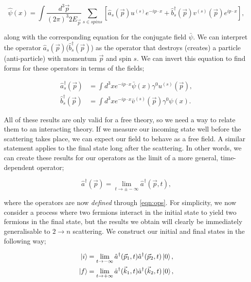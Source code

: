 \begin{equation}
\hat{\psi}(x) = \int \frac{d^3 \vec{p}}{(2 \pi)^3 2 E_{\vec{p}}} \sum_{s \in spins} \left[\hat{a}_s(\vec{p}) u^{(s)} e^{-ip\cdot x} + \hat{b}_s^\dagger(\vec{p}) v^{(s)}(\vec{p})e^{i p \cdot x} \right],
\end{equation}

along with the corresponding equation for the conjugate field $\bar{\psi}$. We can interpret the operator $\hat{a}_s(\vec{p})$($\hat{b}^\dagger_s (\vec{p})$) as the operator that destroys (creates) a particle (anti-particle) with momentum $\vec{p}$ and spin $s$. We can invert this equation to find forms for these operators in terms of the fields;

\begin{subequations}
\label{eqn:ops}
\begin{align}
\hat{a}_s^\dagger (\vec{p}) & = \int d^3 x e^{-i p \cdot x} \bar{\psi}(x) \gamma^0 u^{(s)}(\vec{p}), \\
\hat{b}_s^\dagger (\vec{p}) & = \int d^3 x e^{- i p \cdot x} \bar{v}^{(s)}(\vec{p}) \gamma^0 \psi(x).
\end{align}
\end{subequations}

All of these results are only valid for a free theory, so we need a way to relate them to an interacting theory. If we measure our incoming state well before the scattering takes place, we can expect our field to behave as a free field. A similar statement applies to the final state long after the scattering. In other words, we can create these results for our operators as the limit of a more general, time-dependent operator;

\begin{equation}
\hat{a}^\dagger(\vec{p}) = \lim_{t \to \pm -\infty} \hat{a}^\dagger(\vec{p}, t),
\end{equation}

where the operators are now \emph{defined} through \ref{eqn:ops}. For simplicity, we now consider a process where two fermions interact in the initial state to yield two fermions in the final state, but the results we obtain will clearly be immediately generalisable to $2 \to n$ scattering. We construct our initial and final states in the following way;

\begin{subequations}
\begin{align}
\mathinner{\lvert i\rangle}_{\hspace{-0.1em}} &= \lim_{t \to -\infty} \hat{a}^\dagger(\vec{p}_1,t) \hat{a}^\dagger(\vec{p}_2 ,t) \mathinner{\lvert0\rangle}_{\hspace{-0.1em}}, \\ 
\mathinner{\lvert f\rangle}_{\hspace{-0.1em}} &= \lim_{t \to +\infty} \hat{a}^\dagger(\vec{k}_1,t) \hat{a}^\dagger(\vec{k}_2 ,t) \mathinner{\lvert0\rangle}_{\hspace{-0.1em}},
\end{align}
\end{subequations}

